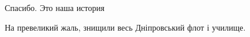  
 
 
 
 

Спасибо. Это наша история

На превеликий жаль, знищили весь Дніпровський флот і училище.
